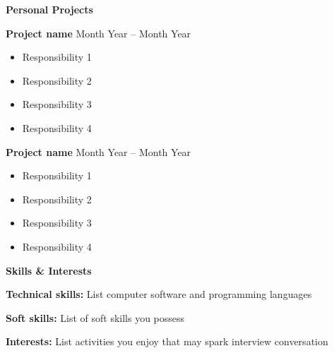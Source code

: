 \documentclass[11pt]{article}
\begin{document}
\begin{center}
    \Large{\textbf{Personal Projects}}
\end{center}

\textbf{Project name}	\hfill Month Year – Month Year

\begin{itemize}[noitemsep, topsep=0pt, partopsep=0pt, parsep=0pt]
    \item Responsibility 1
    \item Responsibility 2
    \item Responsibility 3
    \item Responsibility 4
\end{itemize}
\vspace{10pt}
\textbf{Project name}	\hfill Month Year – Month Year

\begin{itemize}[noitemsep, topsep=0pt, partopsep=0pt, parsep=0pt]
    \item Responsibility 1
    \item Responsibility 2
    \item Responsibility 3
    \item Responsibility 4
\end{itemize}

\begin{center}
    \Large{\textbf{Skills \& Interests}}
\end{center}

\textbf{Technical skills:} List computer software and programming languages

\textbf{Soft skills:} List of soft skills you possess

\textbf{Interests:} List activities you enjoy that may spark interview conversation
\end{document}
